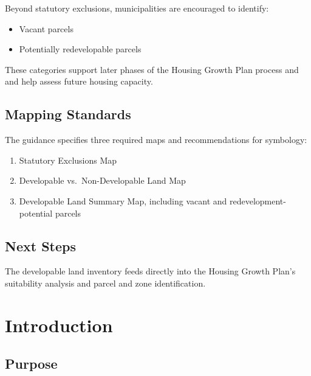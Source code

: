 \documentclass[
  letterpaper,
  DIV=11,
  numbers=noendperiod]{scrreprt}
\begin{document}
Beyond statutory exclusions, municipalities are encouraged to identify:

\begin{itemize}
\item
  Vacant parcels
\item
  Potentially redevelopable parcels
\end{itemize}

These categories support later phases of the Housing Growth Plan process
and and help assess future housing capacity.

\section*{Mapping Standards}\label{mapping-standards}


The guidance specifies three required maps and recommendations for
symbology:

\begin{enumerate}
\def\labelenumi{\arabic{enumi}.}
\item
  Statutory Exclusions Map
\item
  Developable vs.~Non-Developable Land Map
\item
  Developable Land Summary Map, including vacant and
  redevelopment-potential parcels
\end{enumerate}

\section*{Next Steps}\label{next-steps}


The developable land inventory feeds directly into the Housing Growth
Plan's suitability analysis and parcel and zone identification.


\chapter{Introduction}\label{introduction}

\section{Purpose}\label{purpose}
\end{document}
